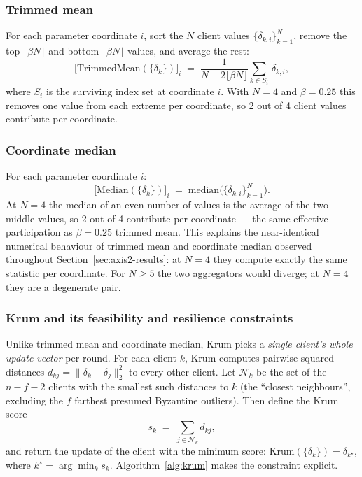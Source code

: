 \documentclass[a4paper,fleqn,doubleblind]{cas-sc}
\begin{document}
\subsubsection{Trimmed mean}
\label{subsec:trimmed}

For each parameter coordinate $i$, sort the $N$ client values
$\{\delta_{k,i}\}_{k=1}^N$, remove the top
$\lfloor \beta N \rfloor$ and bottom $\lfloor \beta N \rfloor$
values, and average the rest:
\begin{equation}
    \bigl[\mathrm{TrimmedMean}(\{\delta_k\})\bigr]_i
    \;=\; \frac{1}{N - 2\lfloor \beta N \rfloor}
    \sum_{k \in S_i}\, \delta_{k,i},
    \label{eq:trimmed}
\end{equation}
where $S_i$ is the surviving index set at coordinate $i$. With
$N = 4$ and $\beta = 0.25$ this removes one value from each extreme
per coordinate, so 2 out of 4 client values contribute per
coordinate.

\subsubsection{Coordinate median}
\label{subsec:median}

For each parameter coordinate $i$:
\begin{equation}
    \bigl[\mathrm{Median}(\{\delta_k\})\bigr]_i
    \;=\; \mathrm{median}\bigl(\{\delta_{k,i}\}_{k=1}^N\bigr).
    \label{eq:median}
\end{equation}
At $N = 4$ the median of an even number of values is the average of
the two middle values, so 2 out of 4 contribute per coordinate ---
the same effective participation as $\beta = 0.25$ trimmed mean.
This explains the near-identical numerical behaviour of trimmed
mean and coordinate median observed throughout
Section~\ref{sec:axis2-results}: at $N = 4$ they compute exactly
the same statistic per coordinate. For $N \geq 5$ the two
aggregators would diverge; at $N = 4$ they are a degenerate pair.

\subsubsection{Krum and its feasibility and resilience constraints}
\label{subsec:krum}

Unlike trimmed mean and coordinate median, Krum
\citep{Blanchard2017Krum} picks a \emph{single client's whole
update vector} per round. For each client $k$, Krum computes
pairwise squared distances $d_{kj} = \| \delta_k - \delta_j \|_2^2$
to every other client. Let $\mathcal{N}_k$ be the set of the
$n - f - 2$ clients with the smallest such distances to $k$ (the
``closest neighbours'', excluding the $f$ farthest presumed
Byzantine outliers). Then define the Krum score
\begin{equation}
    s_k \;=\; \sum_{j \in \mathcal{N}_k} d_{kj},
    \label{eq:krum}
\end{equation}
and return the update of the client with the minimum score:
$\mathrm{Krum}(\{\delta_k\}) = \delta_{k^\star}$, where
$k^\star = \arg\min_k s_k$. Algorithm~\ref{alg:krum} makes the
constraint explicit.
\end{document}
